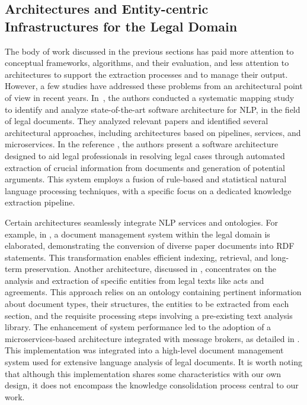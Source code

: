 \subsection{Architectures and Entity-centric Infrastructures for the Legal Domain}
\label{sec:related_arch}
The body of work discussed in the previous sections has paid more attention to conceptual frameworks, algorithms, and their evaluation, and less attention to architectures to support the extraction processes and to manage their output.   
However, a few studies have addressed these problems from an architectural point of view in recent years. In~\cite{PAUZI2023111616}, the authors conducted a systematic mapping study to identify and analyze state-of-the-art software architecture for NLP, in the field of legal documents. They analyzed relevant papers and identified several architectural approaches, including architectures based on pipelines, services, and microservices. 
In the reference \cite{9378375}, the authors present a software architecture designed to aid legal professionals in resolving legal cases through automated extraction of crucial information from documents and generation of potential arguments. This system employs a fusion of rule-based and statistical natural language processing techniques, with a specific focus on a dedicated knowledge extraction pipeline.

Certain architectures seamlessly integrate NLP services and ontologies. For example, in \cite{amato2008}, a document management system within the legal domain is elaborated, demonstrating the conversion of diverse paper documents into RDF statements. This transformation enables efficient indexing, retrieval, and long-term preservation.
Another architecture, discussed in \cite{buey2016}, concentrates on the analysis and extraction of specific entities from legal texts like acts and agreements. This approach relies on an ontology containing pertinent information about document types, their structures, the entities to be extracted from each section, and the requisite processing steps involving a pre-existing text analysis library. The enhancement of system performance led to the adoption of a microservices-based architecture integrated with message brokers, as detailed in \cite{ruiz2020}. This implementation was integrated into a high-level document management system used for extensive language analysis of legal documents. It is worth noting that although this implementation shares some characteristics with our own design, it does not encompass the knowledge consolidation process central to our work. 

